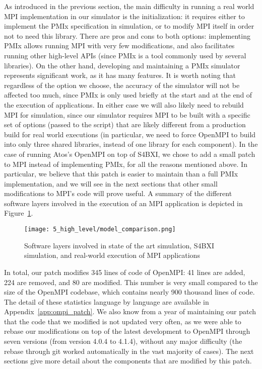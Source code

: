 As introduced in the previous section, the main difficulty in running a real
world MPI implementation in our simulator is the initialization: it requires
either to implement the PMIx specification in simulation, or to modify MPI
itself in order not to need this library. There are pros and cons to both
options: implementing PMIx allows running MPI with very few modifications, and
also facilitates running other high-level APIs (since PMIx is a tool commonly
used by several libraries). On the other hand, developing and maintaining a PMIx
simulator represents significant work, as it has many features. It is worth
noting that regardless of the option we choose, the accuracy of the simulator
will not be affected too much, since PMIx is only used briefly at the start and
at the end of the execution of applications. In either case we will also likely
need to rebuild MPI for simulation, since our simulator requires MPI to be built
with a specific set of options (passed to the  script) that
are likely different from a production build for real world executions (in
particular, we need to force OpenMPI to build into only three shared libraries,
instead of one library for each component). In the case of running Atos's
OpenMPI on top of S4BXI, we chose to add a small patch to MPI instead of
implementing PMIx, for all the reasons mentioned above. In particular, we
believe that this patch is easier to maintain than a full PMIx implementation,
and we will see in the next sections that other small modifications to MPI's
code will prove useful. A summary of the different software layers involved in
the execution of an MPI application is depicted in
Figure~\ref{fig:5_high_level:models_comparison}.

\begin{figure}[!ht]
    \centering
    \texttt{[image: 5\_high\_level/model\_comparison.png]}
    \caption{Software layers involved in state of the art simulation, S4BXI simulation, and real-world execution of MPI applications}
    \label{fig:5_high_level:models_comparison}
\end{figure}

In total, our patch modifies 345 lines of code of OpenMPI: 41 lines are added,
224 are removed, and 80 are modified. This number is very small compared to the
size of the OpenMPI codebase, which contains nearly 900 thousand lines of code.
The detail of these statistics language by language are available in
Appendix~\ref{app:ompi_patch}. We also know from a year of maintaining our patch
that the code that we modified is not updated very often, as we were able to
rebase our modifications on top of the latest development to OpenMPI through
seven versions (from version 4.0.4 to 4.1.4), without any major difficulty (the
rebase through git worked automatically in the vast majority of cases). The next
sections give more detail about the components that are modified by this patch.

